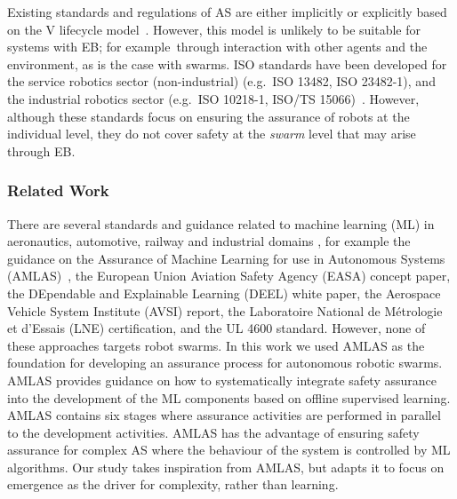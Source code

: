 \documentclass[runningheads]{llncs}
\begin{document}
Existing standards and regulations of AS are either implicitly or explicitly based on the V lifecycle model~\cite{Jia2021}. %
However, this model is unlikely to be suitable for systems with EB; for example\ through interaction with other agents and the environment, as is the case with swarms. 
ISO standards have been developed for the service robotics sector (non-industrial) (e.g.\ ISO 13482, ISO 23482-1), and the industrial robotics sector (e.g.\ ISO 10218-1, ISO/TS 15066)~\cite{Abeywickrama2022}. 
However, although these standards focus on ensuring the assurance of robots at the individual level, they do not cover safety at the \emph{swarm} level that may arise through EB. 
%
\subsubsection{Related Work} There are several standards and guidance related to machine learning (ML) in aeronautics, automotive, railway and industrial domains \cite{Kaakai2022}, for example the guidance on the Assurance of Machine Learning for use in Autonomous Systems (AMLAS)~\cite{Hawkins2021}, the European Union Aviation Safety Agency (EASA) concept paper, the DEpendable and Explainable Learning (DEEL) white paper, the Aerospace Vehicle System Institute (AVSI) report, the Laboratoire National de Métrologie et d'Essais (LNE) certification, and the UL 4600 standard. However, none of these approaches targets robot swarms. 
In this work we used AMLAS \cite{Hawkins2021} as the foundation for developing an assurance process for autonomous robotic swarms. 
AMLAS provides guidance on how to systematically integrate safety assurance into the development of the ML components based on offline supervised learning. 
AMLAS contains six stages where assurance activities are performed in parallel to the development activities. 
AMLAS has the advantage of ensuring safety assurance for complex AS where the behaviour of the system is controlled by ML algorithms. 
Our study takes inspiration from AMLAS, but adapts it to focus on emergence as the driver for complexity, rather than learning. 
\vspace{-1ex}
\end{document}
